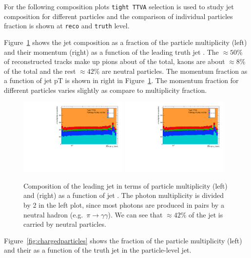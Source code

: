 For the following composition plots \texttt{tight TTVA} selection is used to study jet composition for different particles and the comparison of individual particles fraction is shown at \texttt{reco} and \texttt{truth} level.

Figure~\ref{fig:truthJetComp} shows the jet composition as a fraction of the particle multiplicity (left) and their momentum (right) as a function of the leading truth jet \pT{}. The $\approx 50$\% of reconstructed tracks make up pions about of the total, kaons are about $\approx 8$\% of the total and the rest $\approx 42$\% are neutral particles. The momentum fraction as a function of jet pT is shown in right in Figure~\ref{fig:truthJetComp}. The momentum fraction for different particles varies slightly as compare to multiplicity fraction.

\begin{figure}[b]
\centering
\includegraphics[width=0.48\textwidth,page=1]{figures/jet_comp_study_fixedGamma.pdf}
\includegraphics[width=0.48\textwidth,page=2]{figures/jet_comp_study_fixedGamma.pdf}%
\caption{Composition of the leading jet in terms of particle multiplicity (left) and \pt{} (right) as a function of jet \pt{}. The photon multiplicity is divided by 2 in the left plot, since most photons are produced in pairs by a neutral hadron (e.g.\ $\pi\to\gamma\gamma$).
We can see that $\approx 42$\% of the jet \pt{} is carried by neutral particles.}
\label{fig:truthJetComp}
\end{figure}

Figure~\ref{fig:chargedparticles} shows the fraction of the particle multiplicity (left) and their \pT{} as a function of the truth jet \pT in the particle-level jet.

